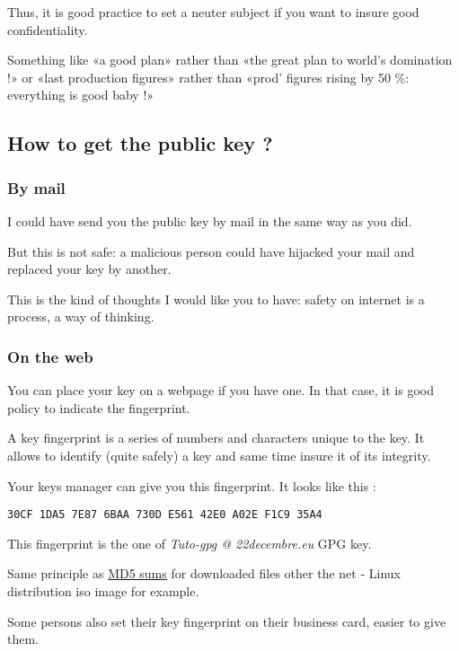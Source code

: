 Thus, it is good practice to set a neuter subject if you want to insure
good confidentiality.

Something like «a good plan» rather than «the great plan to world's
domination !» or «last production figures» rather than «prod' figures
rising by 50 \%: everything is good baby !»

\subsection{How to get the public key ?}\label{how-to-get-the-public-key}

\subsubsection{By mail}\label{by-mail}

I could have send you the public key by mail in the same way as you did.

But this is not safe: a malicious person could have hijacked your mail
and replaced your key by another.

This is the kind of thoughts I would like you to have: safety on
internet is a process, a way of thinking.

\subsubsection{On the web}\label{on-the-web}

You can place your key on a webpage if you have one. In that case, it is
good policy to indicate the fingerprint.

A key fingerprint is a series of numbers and characters unique to the
key. It allows to identify (quite safely) a key and same time insure it
of its integrity.

Your keys manager can give you this fingerprint. It looks like this :

\begin{verbatim}
30CF 1DA5 7E87 6BAA 730D E561 42E0 A02E F1C9 35A4
\end{verbatim}

This fingerprint is the one of \emph{Tuto-gpg @ 22decembre.eu} GPG key.

Same principle as \href{http://en.wikipedia.org/wiki/MD5}{MD5 sums} for
downloaded files other the net - Linux distribution iso image for
example.

Some persons also set their key fingerprint on their business card,
easier to give them.

